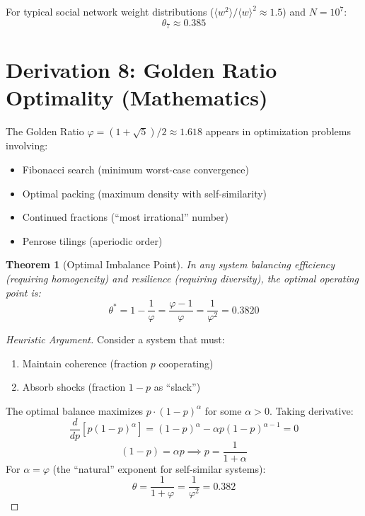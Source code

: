 \documentclass[11pt]{article}
\newtheorem{theorem}{Theorem}
\begin{document}
For typical social network weight distributions ($\langle w^2 \rangle / \langle w \rangle^2 \approx 1.5$) and $N = 10^7$:
\begin{equation}
\theta_7 \approx \mathbf{0.385}
\end{equation}

\section{Derivation 8: Golden Ratio Optimality (Mathematics)}

The Golden Ratio $\varphi = (1 + \sqrt{5})/2 \approx 1.618$ appears in optimization problems involving:
\begin{itemize}
\item Fibonacci search (minimum worst-case convergence)
\item Optimal packing (maximum density with self-similarity)
\item Continued fractions (``most irrational'' number)
\item Penrose tilings (aperiodic order)
\end{itemize}

\begin{theorem}[Optimal Imbalance Point]
In any system balancing \emph{efficiency} (requiring homogeneity) and \emph{resilience} (requiring diversity), the optimal operating point is:
\begin{equation}
\theta^* = 1 - \frac{1}{\varphi} = \frac{\varphi - 1}{\varphi} = \frac{1}{\varphi^2} = \mathbf{0.3820}
\end{equation}
\end{theorem}

\begin{proof}[Heuristic Argument]
Consider a system that must:
\begin{enumerate}
\item Maintain coherence (fraction $p$ cooperating)
\item Absorb shocks (fraction $1-p$ as ``slack'')
\end{enumerate}
The optimal balance maximizes $p \cdot (1-p)^\alpha$ for some $\alpha > 0$. Taking derivative:
\begin{equation}
\frac{d}{dp}[p(1-p)^\alpha] = (1-p)^\alpha - \alpha p (1-p)^{\alpha-1} = 0
\end{equation}
\begin{equation}
(1-p) = \alpha p \implies p = \frac{1}{1+\alpha}
\end{equation}
For $\alpha = \varphi$ (the ``natural'' exponent for self-similar systems):
\begin{equation}
\theta = \frac{1}{1+\varphi} = \frac{1}{\varphi^2} = 0.382
\end{equation}
\end{proof}
\end{document}
